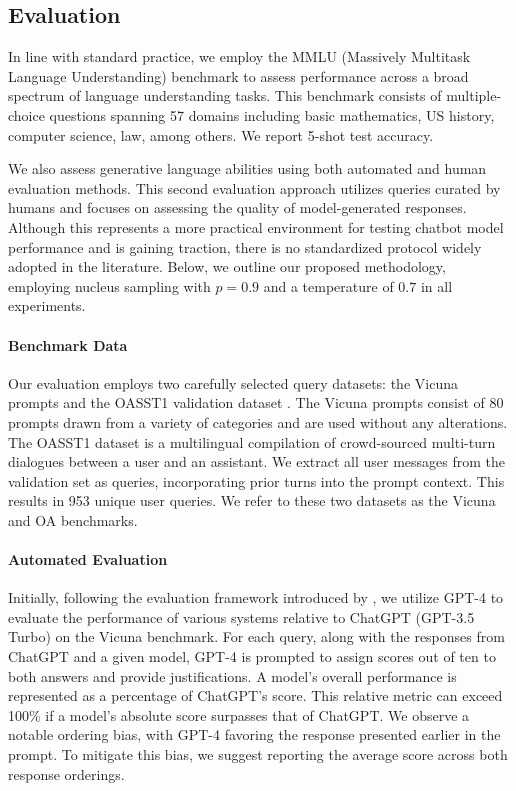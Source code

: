 \subsection{Evaluation}

In line with standard practice, we employ the MMLU (Massively Multitask Language Understanding) benchmark \citep{hendrycksmeasuring} to assess performance across a broad spectrum of language understanding tasks. This benchmark consists of multiple-choice questions spanning 57 domains including basic mathematics, US history, computer science, law, among others. We report 5-shot test accuracy.

We also assess generative language abilities using both automated and human evaluation methods. This second evaluation approach utilizes queries curated by humans and focuses on assessing the quality of model-generated responses. Although this represents a more practical environment for testing chatbot model performance and is gaining traction, there is no standardized protocol widely adopted in the literature. Below, we outline our proposed methodology, employing nucleus sampling with $p=0.9$ and a temperature of $0.7$ in all experiments.

\paragraph{Benchmark Data} Our evaluation employs two carefully selected query datasets: the Vicuna prompts \citep{vicuna2023} and the OASST1 validation dataset \citep{kopf2023openassistant}. The Vicuna prompts consist of 80 prompts drawn from a variety of categories and are used without any alterations. The OASST1 dataset is a multilingual compilation of crowd-sourced multi-turn dialogues between a user and an assistant. We extract all user messages from the validation set as queries, incorporating prior turns into the prompt context. This results in 953 unique user queries. We refer to these two datasets as the Vicuna and OA benchmarks.

\paragraph{Automated Evaluation} Initially, following the evaluation framework introduced by \citet{vicuna2023}, we utilize GPT-4 to evaluate the performance of various systems relative to ChatGPT (GPT-3.5 Turbo) on the Vicuna benchmark. For each query, along with the responses from ChatGPT and a given model, GPT-4 is prompted to assign scores out of ten to both answers and provide justifications. A model's overall performance is represented as a percentage of ChatGPT's score. This relative metric can exceed 100\% if a model's absolute score surpasses that of ChatGPT. We observe a notable ordering bias, with GPT-4 favoring the response presented earlier in the prompt. To mitigate this bias, we suggest reporting the average score across both response orderings.

